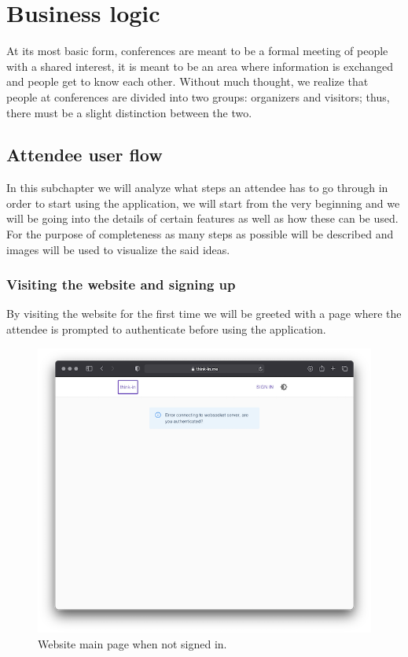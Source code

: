 \chapter{Business logic}

At its most basic form, conferences are meant to be a formal meeting of people with a shared interest, it is meant to be an area where information is exchanged and people get to know each other. Without much thought, we realize that people at conferences are divided into two groups: organizers and visitors; thus, there must be a slight distinction between the two.


\section{Attendee user flow}

In this subchapter we will analyze what steps an attendee has to go through in order to start using the application, we will start from the very beginning and we will be going into the details of certain features as well as how these can be used. For the purpose of completeness as many steps as possible will be described and images will be used to visualize the said ideas.

\subsection{Visiting the website and signing up}
By visiting the website for the first time we will be greeted with a page where the attendee is prompted to authenticate before using the application.

\begin{figure}[H]
	\includegraphics[width=\textwidth,keepaspectratio]{images/business_logic/main_page_not_signed_in.png}
	\caption{Website main page when not signed in.}
	\label{figure:website-main-page}
\end{figure}

